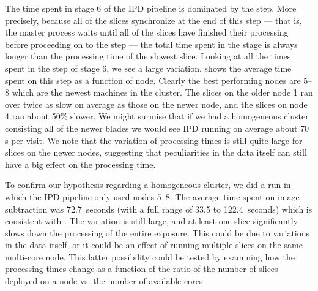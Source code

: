The time spent in stage 6 of the IPD pipeline is dominated by the 
 step.  More precisely, because all of the slices
synchronize at the end of this step --- that is, the master process waits
until all of the slices have finished their processing before
proceeding on to the  step --- the total time spent
in the stage is always longer than the processing time of the slowest
slice.  Looking at all the times spent in the  step of
stage 6, we see a large variation.   shows the
average time spent on this step as a function of node.  Clearly the
best performing nodes are 5--8 which are the newest machines in the
cluster.  The slices on the older node 1 ran over twice as slow on
average as those on the newer node, and the slices on node 4 ran about
50\% slower.  We might surmise that if we had a homogeneous cluster
consisting all of the newer blades we would see IPD running on average
about 70 s per visit.  We note that the variation of processing times
is still quite large for slices on the newer nodes, suggesting that
peculiarities in the data itself can still have a big effect on the
processing time.

To confirm our hypothesis regarding a homogeneous cluster, we did a
run in which the IPD pipeline only used nodes 5--8.  The average time
spent on image subtraction was 72.7~seconds (with a full range of 33.5
to 122.4~seconds) which is consistent with .
The variation is still large, and at least one slice significantly
slows down the processing of the entire exposure.  This could be due
to variations in the data itself, or it could be an effect of running
multiple slices on the same multi-core node.  This latter possibility
could be tested by examining how the processing times change as a
function of the ratio of the number of slices deployed on a node
vs. the number of available cores.  

